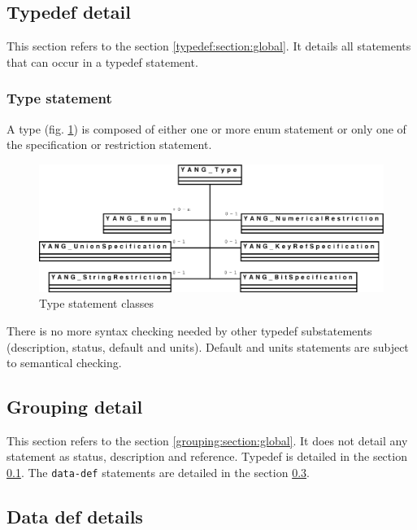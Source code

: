 \documentclass[a4paper]{article}
\begin{document}
\subsection{Typedef detail}
\label{typedef:section:detail}

This  section refers to  the section  \ref{typedef:section:global}. It
details all statements that can occur in a typedef statement.

\subsubsection{Type statement}
\label{type:section:global}

 A  type (fig.  \ref{type}) is  composed of  either one  or  more enum
 statement or only one of the specification or restriction statement.
\begin{figure}[htbp]
\begin{center}
\includegraphics[scale = .3]{type.eps}
\end{center}
\caption{Type statement classes}
\label{type}
\end{figure}

There  is   no  more  syntax   checking  needed  by   other  typedef
substatements  (description, status, default  and units).  Default and
units statements are subject to semantical checking.

\subsection{Grouping detail}
\label{grouping:section:details}

This section  refers to the  section \ref{grouping:section:global}. It
does not  detail any statement  as status, description  and reference.
Typedef is detailed  in the section \ref{typedef:section:detail}.  The
{\tt    data-def}   statements   are    detailed   in    the   section
\ref{datadef:section:detail}.

\subsection{Data def details}
\label{datadef:section:detail}
\end{document}
